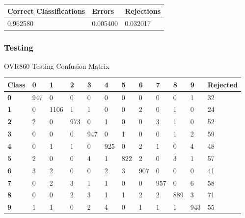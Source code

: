 \documentclass[
  a4paper,            %
  DIV=10,             %
  oneside,            %
  BCOR=5mm,           %
  parskip=half,       %
  numbers=noenddot,   %
  bibtotoc,           %
  listof=totoc,        %
  article
]{scrreprt}
\begin{document}
\begin{center}
  \begin{tabular}{|p{5cm}|p{3cm}|p{3cm}|}
    \hline
    \textbf{Correct Classifications} & \textbf{Errors} & \textbf{Rejections} \\
    \hline
    0.962580 & 0.005400 & 0.032017 \\
    \hline
  \end{tabular}
\end{center}
\subsubsection{Testing}
\begin{center}
  \small{OVR860 Testing Confusion Matrix}
  \begin{tabular}{|p{1cm}|p{1cm}|p{1cm}|p{1cm}|p{1cm}|p{1cm}|p{1cm}|p{1cm}|p{1cm}|p{1cm}|p{1cm}|p{1.7cm}|}
    \hline
    \textbf{Class} & \textbf{0} & \textbf{1} & \textbf{2} & \textbf{3} & \textbf{4} & \textbf{5} & \textbf{6} & \textbf{7} & \textbf{8} & \textbf{9} & \textbf{Rejected} \\
    \hline
    \textbf{0} & 947 & 0 & 0 & 0 & 0 & 0 & 0 & 0 & 0 & 1 & 32 \\
    \hline
    \textbf{1} & 0 & 1106 & 1 & 1 & 0 & 0 & 2 & 0 & 1 & 0 & 24 \\
    \hline
    \textbf{2} & 2 & 0 & 973 & 0 & 1 & 0 & 0 & 3 & 1 & 0 & 52 \\
    \hline
    \textbf{3} & 0 & 0 & 0 & 947 & 0 & 1 & 0 & 0 & 1 & 2 & 59 \\
    \hline
    \textbf{4} & 0 & 1 & 1 & 0 & 925 & 0 & 2 & 1 & 0 & 4 & 48 \\
    \hline
    \textbf{5} & 2 & 0 & 0 & 4 & 1 & 822 & 2 & 0 & 3 & 1 & 57 \\
    \hline
    \textbf{6} & 3 & 2 & 0 & 0 & 2 & 3 & 907 & 0 & 0 & 0 & 41 \\
    \hline
    \textbf{7} & 0 & 2 & 3 & 1 & 1 & 0 & 0 & 957 & 0 & 6 & 58 \\
    \hline
    \textbf{8} & 0 & 0 & 2 & 3 & 1 & 1 & 2 & 2 & 889 & 3 & 71 \\
    \hline
    \textbf{9} & 1 & 1 & 0 & 2 & 4 & 0 & 1 & 1 & 1 & 943 & 55 \\
    \hline
  \end{tabular}
\end{center}
\end{document}
